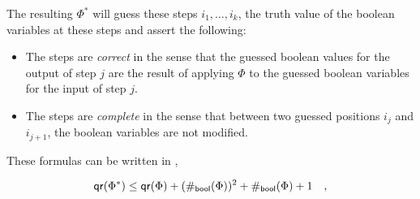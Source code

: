 The resulting  $\Phi^*$ will guess these 
steps $i_1, \dots, i_k$, the truth value of the boolean variables at 
these steps and assert the following:
\begin{itemize}
    \item The steps are \emph{correct}  in the sense
        that the guessed boolean values for the output of step $j$
        are the result of applying $\Phi$ to the guessed boolean
        variables for the input of step $j$.
    \item The steps are \emph{complete} in the sense
        that between two guessed positions $i_j$ and $i_{j+1}$,
        the boolean variables are not modified.
\end{itemize}
These formulas can be written in ,

\begin{equation*}
    \mathop{\mathsf{qr}}(\Phi^*) 
    \leq \mathop{\mathsf{qr}}(\Phi) 
    + (\mathop{\#_\mathsf{bool}}(\Phi))^2
    + \mathop{\#_\mathsf{bool}}(\Phi)
    + 1 \quad ,
\end{equation*}
